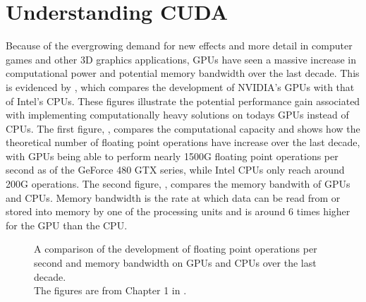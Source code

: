 \chapter{Understanding CUDA}\label{chp:GPGPU}



Because of the evergrowing demand for new effects and more detail in computer
games and other 3D graphics applications, GPUs have seen a massive increase in
computational power and potential memory bandwidth over the last decade. This is
evidenced by , which compares the development of
NVIDIA's GPUs with that of Intel's CPUs. These figures illustrate the potential
performance gain associated with implementing computationally heavy solutions on
todays GPUs instead of CPUs. The first figure, ,
compares the computational capacity and shows how the theoretical number of
floating point operations have increase over the last decade, with GPUs being
able to perform nearly 1500G floating point operations per second as of the
GeForce 480 GTX series, while Intel CPUs only reach around 200G operations. The
second figure, , compares the memory bandwith of
GPUs and CPUs. Memory bandwidth is the rate at which data can be read from or
stored into memory by one of the processing units and is around 6 times higher
for the GPU than the CPU.

\begin{figure}
  \centering 

  \hspace{0.05\textwidth}
  
  \caption[Comparison of FLOPS and memory bandwidth on GPUs and CPUs.]{A comparison
    of the development of floating point operations per second and memory
    bandwidth on GPUs and CPUs over the last decade. \\The figures are from Chapter 1 in
    .}\label{fig:gpuCpuCompare}
\end{figure}


